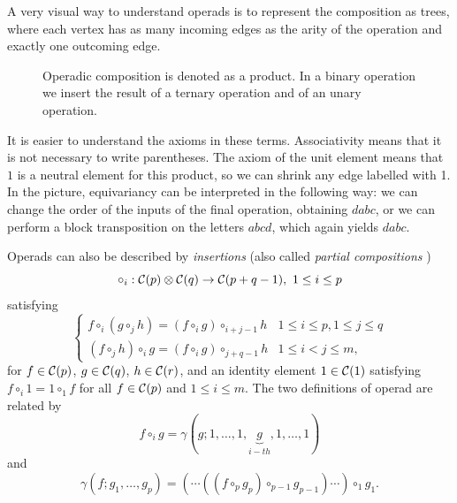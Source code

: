 \documentclass[TFM.tex]{subfiles}
\begin{document}


A very visual way to understand operads is to represent the composition as trees, where each vertex has as many incoming edges as the arity of the operation and exactly one outcoming edge. 

\begin{figure}[h!]
\caption{Operadic composition is denoted as a product. In a binary operation we insert the result of a ternary operation and of an unary operation.}
\end{figure}

It is easier to understand the axioms in these terms. Associativity means that it is not necessary to write parentheses. The axiom of the unit element means that $1$ is a neutral element for this product, so we can shrink any edge labelled with 1. In the picture, equivariancy can be interpreted in the following way: we can change the order of the inputs of the final operation, obtaining $dabc$, or we can perform a block transposition on the letters $abcd$, which again yields $dabc$. 

Operads can also be described by \emph{insertions} (also called \emph{partial compositions} \cite{das})
\[
\circ_i:\mathcal{C}(p)\otimes\mathcal{C}(q)\to \mathcal{C}(p+q-1),\ 1\leq i\leq p
\]
satisfying 
\[
\begin{cases}
f\circ_i(g\circ_j h)=(f\circ_i g)\circ_{i+j-1} h & 1\leq i\leq p, 1\leq j\leq q\\
(f\circ_j h)\circ_i g=(f\circ_i g)\circ_{j+q-1}h & 1\leq i<j\leq m,
\end{cases}
\]
for $f\in\mathcal{C}(p)$, $g\in\mathcal{C}(q)$, $h\in\mathcal{C}(r)$, and an identity element $1\in\mathcal{C}(1)$ satisfying $f\circ_i 1=1\circ_1 f$ for all $f\in\mathcal{C}(p)$ and $1\leq i\leq m$. The two definitions of operad are related by
\[
f\circ_i g=\gamma(g;1,\dots, 1,\underbrace{g}_{i-th},1,\dots, 1)
\]
and
\[
\gamma(f;g_1,\dots, g_p)= (\cdots((f\circ_p g_p)\circ_{p-1} g_{p-1})\cdots)\circ_1 g_1.
\]
\end{document}
